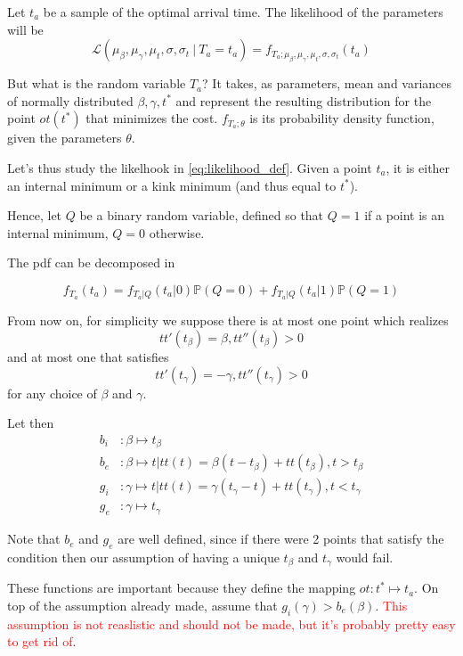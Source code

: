 \documentclass{article}
\begin{document}
Let \(t_a\) be a sample of the optimal arrival time. The likelihood of the parameters will be
\begin{equation}
  \label{eq:likelihood_def}
  \mathcal{L}(\mu_\beta, \mu_\gamma, \mu_t, \sigma, \sigma_t\ \vert\ T_a = t_a) =
  f_{T_a; \mu_\beta, \mu_\gamma, \mu_t, \sigma, \sigma_t}(t_a)
\end{equation}

But what is the random variable \(T_a\)?
It takes, as parameters, mean and variances of normally distributed \(\beta, \gamma, t^*\) and represent the resulting distribution for the point \(ot(t^*)\) that minimizes the cost.
\(f_{T_a; \theta}\) is its probability density function, given the parameters \(\theta\).

Let's thus study the likelhook in \eqref{eq:likelihood_def}.
Given a point \(t_a\), it is either an internal minimum or a kink minimum (and thus equal to \(t^*\)).

Hence, let \(Q\) be a binary random variable, defined so that \(Q=1\) if a point is an internal minimum, \(Q=0\) otherwise.

The pdf can be decomposed in

\begin{equation}
  \label{eq:likelihood_split}
  f_{T_a}(t_a) = f_{T_a | Q}(t_a | 0)\mathbb{P}(Q = 0) + f_{T_a | Q}(t_a | 1)\mathbb{P}(Q = 1)
\end{equation}

From now on, for simplicity we suppose there is at most one point which realizes
\[tt'(t_\beta) = \beta, tt''(t_\beta) > 0\]
and at most one that satisfies
\[tt'(t_\gamma) = -\gamma, tt''(t_\gamma) > 0\]
for any choice of \(\beta\) and \(\gamma\).

Let then
\begin{align*}
  b_i & : \beta \mapsto t_\beta \\
  b_e & : \beta \mapsto t | tt(t) = \beta (t - t_\beta) + tt(t_\beta), t > t_\beta\\
  g_i & : \gamma \mapsto t | tt(t) = \gamma (t_\gamma - t) + tt(t_\gamma), t < t_\gamma\\
  g_e & : \gamma \mapsto t_\gamma
\end{align*}

Note that \(b_e\) and \(g_e\) are well defined, since if there were 2 points that satisfy the condition then our assumption of having a unique \(t_\beta\) and \(t_\gamma\) would fail.

These functions are important because they define the mapping \(ot: t^* \mapsto t_a\).
On top of the assumption already made, assume that \(g_i(\gamma) > b_e(\beta)\). \textcolor{red}{This assumption is not reaslistic and should not be made, but it's probably pretty easy to get rid of}.
\end{document}
